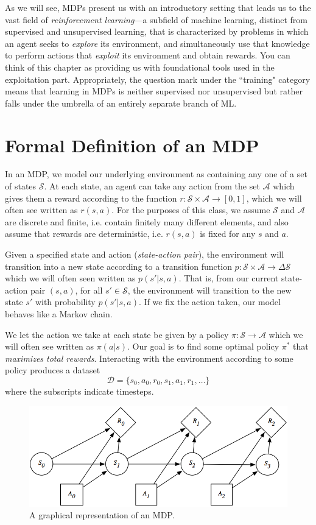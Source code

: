 As we will see, MDPs present us with an introductory setting that leads us to the vast field of \textit{reinforcement learning}---a subfield of machine learning, distinct from supervised and unsupervised learning, that is characterized by problems in which an agent seeks to \textit{explore} its environment, and simultaneously use that knowledge to perform actions that \textit{exploit} its environment and obtain rewards. You can think of this chapter as providing us with foundational tools used in the exploitation part.  Appropriately, the question mark under the ``training" category means that learning in MDPs is neither supervised nor unsupervised but rather falls under the umbrella of an entirely separate branch of ML. 

\section{Formal Definition of an MDP}
In an MDP, we model our underlying environment as containing any one of a set of states $\mathcal{S}$. At each state, an agent can take any action from the set $\mathcal{A}$ which gives them a reward according to the function $r: \mathcal{S} \times \mathcal{A} \rightarrow [0, 1]$, which we will often see written as $r(s, a)$. For the purposes of this class, we assume $\mathcal{S}$ and $\mathcal{A}$ are discrete and finite, i.e. contain finitely many different elements, and also assume that rewards are deterministic, i.e. $r(s,a)$ is fixed for any $s$ and $a$.

Given a specified state and action (\textit{state-action pair}), the environment will transition into a new state according to a transition function $p: \mathcal{S} \times \mathcal{A}\to \Delta \mathcal{S}$ which we will often seen written as $p(s'|s, a)$. That is, from our current state-action pair $(s,a)$, for all $s'\in \mathcal{S}$, the environment will transition to the new state $s'$ with probability $p(s'|s,a)$. If we fix the action taken, our model behaves like a Markov chain.

We let the action we take at each state be given by a policy $\pi: \mathcal{S} \rightarrow \mathcal{A}$ which we will often see written as $\pi(a|s)$. Our goal is to find some optimal policy $\pi^*$ that \textit{maximizes total rewards}. Interacting with the environment according to some policy produces a dataset 
$$\mathcal{D} = \{s_0, a_0, r_0, s_1, a_1, r_1, \dots\}$$
where the subscripts indicate timesteps.

\begin{figure}[H]
    \centering
    \includegraphics[width=0.5\paperwidth]{../MarkovDecisionProcesses/fig/MDP.png}
    \caption{A graphical representation of an MDP.}
\end{figure}

